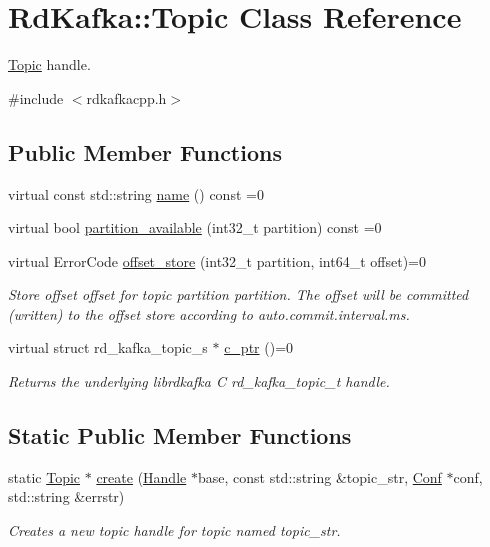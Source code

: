 \hypertarget{classRdKafka_1_1Topic}{
\section{RdKafka::Topic Class Reference}
\label{classRdKafka_1_1Topic}
}


\hyperlink{classRdKafka_1_1Topic}{Topic} handle.  


{\ttfamily \#include $<$rdkafkacpp.h$>$}\subsection*{Public Member Functions}
\begin{DoxyCompactItemize}
\item 
virtual const std::string \hyperlink{classRdKafka_1_1Topic_af61ec8b3c384a8de5a12f804e771c63d}{name} () const =0
\item 
virtual bool \hyperlink{classRdKafka_1_1Topic_a8e2f4ce86845398312d319001462577c}{partition\_\-available} (int32\_\-t partition) const =0
\item 
virtual ErrorCode \hyperlink{classRdKafka_1_1Topic_a218a291c89f5d4c311bec3c2b2bd8056}{offset\_\-store} (int32\_\-t partition, int64\_\-t offset)=0
\begin{DoxyCompactList}\small\item\em Store offset {\ttfamily offset} for topic partition {\ttfamily partition}. The offset will be committed (written) to the offset store according to {\ttfamily auto.commit.interval.ms}. \item\end{DoxyCompactList}\item 
virtual struct rd\_\-kafka\_\-topic\_\-s $\ast$ \hyperlink{classRdKafka_1_1Topic_ab2b9c16211db4036939d95a5dbd07c94}{c\_\-ptr} ()=0
\begin{DoxyCompactList}\small\item\em Returns the underlying librdkafka C rd\_\-kafka\_\-topic\_\-t handle. \item\end{DoxyCompactList}\end{DoxyCompactItemize}
\subsection*{Static Public Member Functions}
\begin{DoxyCompactItemize}
\item 
static \hyperlink{classRdKafka_1_1Topic}{Topic} $\ast$ \hyperlink{classRdKafka_1_1Topic_a01b26449715177b98a3f7edaf42d75a7}{create} (\hyperlink{classRdKafka_1_1Handle}{Handle} $\ast$base, const std::string \&topic\_\-str, \hyperlink{classRdKafka_1_1Conf}{Conf} $\ast$conf, std::string \&errstr)
\begin{DoxyCompactList}\small\item\em Creates a new topic handle for topic named {\ttfamily topic\_\-str}. \item\end{DoxyCompactList}\end{DoxyCompactItemize}
